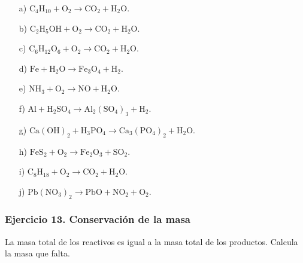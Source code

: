 \begin{enumerate}
    \item[a)] $\mathrm{C_4H_{10}}+\mathrm{O_2}\rightarrow
    \mathrm{CO_2}+\mathrm{H_2O}$.
    \item[b)] $\mathrm{C_2H_5OH}+\mathrm{O_2}\rightarrow
    \mathrm{CO_2}+\mathrm{H_2O}$.
    \item[c)] $\mathrm{C_6H_{12}O_6}+\mathrm{O_2}\rightarrow
    \mathrm{CO_2}+\mathrm{H_2O}$.
    \item[d)] $\mathrm{Fe}+\mathrm{H_2O}\rightarrow\mathrm{Fe_3O_4}+\mathrm{H_2}$.
    \item[e)] $\mathrm{NH_3}+\mathrm{O_2}\rightarrow\mathrm{NO}+\mathrm{H_2O}$.
    \item[f)] $\mathrm{Al}+\mathrm{H_2SO_4}\rightarrow
    \mathrm{Al_2(SO_4)_3}+\mathrm{H_2}$.
    \item[g)] $\mathrm{Ca(OH)_2}+\mathrm{H_3PO_4}\rightarrow
    \mathrm{Ca_3(PO_4)_2}+\mathrm{H_2O}$.
    \item[h)] $\mathrm{FeS_2}+\mathrm{O_2}\rightarrow
    \mathrm{Fe_2O_3}+\mathrm{SO_2}$.
    \item[i)] $\mathrm{C_8H_{18}}+\mathrm{O_2}\rightarrow
    \mathrm{CO_2}+\mathrm{H_2O}$.
    \item[j)] $\mathrm{Pb(NO_3)_2}\rightarrow
    \mathrm{PbO}+\mathrm{NO_2}+\mathrm{O_2}$.
\end{enumerate}

\subsubsection*{Ejercicio 13. Conservación de la masa}

La masa total de los reactivos es igual a la masa total de los productos.
Calcula la masa que falta.

